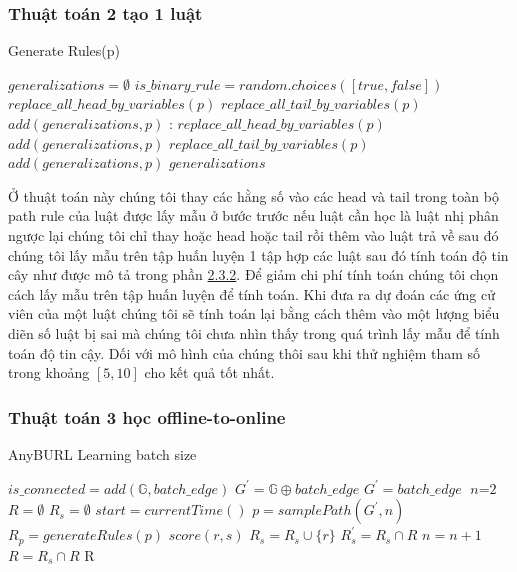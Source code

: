 \subsubsection{Thuật toán 2 tạo 1 luật}
\begin{algorithm}
\caption{Generate Rules(p)}\label{euclid}
\begin{algorithmic}[1]
\State $\textit{generalizations} = \emptyset$
\State $is\_binary\_rule = random.choices([true,false])$
	\State $replace\_all\_head\_by\_variables(p)$
	\State $replace\_all\_tail\_by\_variables(p)$
	\State $add(generalizations, p)$
\Else:
    \State $replace\_all\_head\_by\_variables(p)$
    \State $add(generalizations, p)$
    \State $replace\_all\_tail\_by\_variables(p)$
	\State $add(generalizations, p)$
\EndIf
\Return $generalizations$
\EndProcedure
\end{algorithmic}
\end{algorithm}

Ở thuật toán này chúng tôi thay các hằng số vào các head và tail trong toàn bộ path rule  của luật được lấy mẫu ở bước trước nếu luật cần học là luật nhị phân ngược lại chúng tôi chỉ thay hoặc head hoặc tail rồi thêm vào luật trả về sau đó chúng tôi lấy mẫu trên tập huấn luyện 1 tập hợp các luật sau đó tính toán độ tin cây như được mô tả trong phần \hyperref[kg]{2.3.2}. Để giảm chi phí tính toán chúng tôi chọn cách lấy mẫu trên tập huấn luyện để tính toán. Khi đưa ra dự đoán các ứng cử viên của một luật chúng tôi sẽ tính toán lại bằng cách thêm vào một lượng biểu diẽn số luật bị sai mà chúng tôi chưa nhìn thấy trong quá trình lấy mẫu để tính toán độ tin cậy. Dối với mô hình của chúng thôi sau khi thử nghiệm tham số trong khoảng \([5, 10]\) cho kết quả tốt nhất.

\subsubsection{Thuật toán 3 học offline-to-online}
\begin{algorithm}
\caption{AnyBURL Learning batch size}\label{euclid}
\begin{algorithmic}[1]
\State $is\_connected = add(\mathbb{G}, batch\_edge)$
	\State  $ G^{\prime} = \mathbb{G} \oplus batch\_edge$
\Else
    \State  $ G^{\prime} = batch\_edge$
\EndIf
\State $\textit{n} = \text{2}$
\State $R = \emptyset$
\Loop
\State $R_s = \emptyset$
\State $start = currentTime()$
\Repeat
\State $p = samplePath(G^{\prime}, n)$
\State $R_p = generateRules(p)$
\State $score(r, s)$
	\State $R_s = R_s \cup \{r\}$
\EndIf
\EndFor
{}
\State $R^{\prime}_s = R_s \cap R$
	\State $n = n + 1$
\EndIf
\State $R = R_s \cap R$
\EndLoop
\Return R
\EndProcedure
\end{algorithmic}
\end{algorithm}

